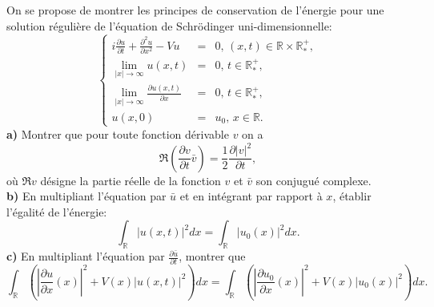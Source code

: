 \documentclass[12pt,a4paper]{article}
\begin{document}
\begin{enumerate}
On se propose de montrer les principes de conservation de l'\'energie
pour une solution r\'eguli\`ere de l'\'equation de Schr\"odinger uni-dimensionnelle:
\begin{equation}
\left\{\begin{array}{lcl}
\displaystyle i\frac{\partial u}{\partial t}+\frac{\partial^2 u}{\partial x^2} -V u &=&0,\, (x,t)\in\mathbb{R}\times
\mathbb{R}_*^+,\\
\displaystyle\lim_{|x|\rightarrow\infty}u(x,t)  &=& 0,\, t\in
\mathbb{R}_*^+, \\
\displaystyle\lim_{|x|\rightarrow\infty}\frac{\partial
  u(x,t)}{\partial x}  &=& 0,\, t\in
\mathbb{R}_*^+, \\
u(x,0) & = & u_0,\,x\in \mathbb{R}.
\end{array}\right.
\end{equation}
{\bf a)} Montrer que pour toute fonction d\'erivable $v$ on a
\begin{equation}
\Re\left(\frac{\partial v}{\partial t}\bar v\right) =
\frac{1}{2}\frac{\partial |v|^2}{\partial t},
\end{equation}
o\`u $\Re v$ d\'esigne la partie r\'eelle de la fonction $v$ et $\bar v$
son conjugu\'e complexe.\\
{\bf b)} En multipliant l'\'equation par $\bar u$ et en int\'egrant par
rapport \`a $x$, \'etablir l'\'egalit\'e de l'\'energie:
\begin{equation}
\int_{\mathbb{R}}|u(x,t)|^2dx = \int_{\mathbb{R}}|u_0(x)|^2dx.
\end{equation}
{\bf c)} En multipliant l'\'equation par $\frac{\partial \bar
  u}{\partial t}$, montrer que
\begin{equation}
\int_{\mathbb{R}}\left(\left|\frac{\partial u}{\partial
      x}(x)\right|^2 +V(x) |u(x,t)|^2\right)dx = \int_{\mathbb{R}}\left(\left|\frac{\partial u_0}{\partial
      x}(x)\right|^2 +V(x) |u_0(x)|^2\right)dx.
\end{equation}
\end{enumerate}
\end{document}
